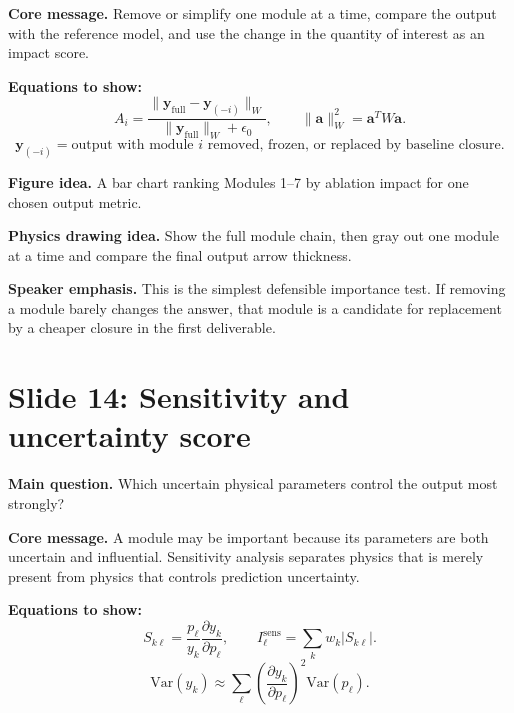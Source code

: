 \documentclass[11pt]{article}
\begin{document}
\textbf{Core message.} Remove or simplify one module at a time, compare the output with the reference model, and use the change in the quantity of interest as an impact score.

\textbf{Equations to show:}
\begin{equation*}
A_i =
\frac{\|\mathbf{y}_{\mathrm{full}}-
\mathbf{y}_{(-i)}\|_W}{\|\mathbf{y}_{\mathrm{full}}\|_W+\epsilon_0},
\qquad
\|\mathbf{a}\|_W^2=\mathbf{a}^{T}W\mathbf{a}.
\end{equation*}
\begin{equation*}
\mathbf{y}_{(-i)}=\text{output with module }i\text{ removed, frozen, or replaced by baseline closure}.
\end{equation*}

\textbf{Figure idea.} A bar chart ranking Modules 1--7 by ablation impact for one chosen output metric.

\textbf{Physics drawing idea.} Show the full module chain, then gray out one module at a time and compare the final output arrow thickness.

\textbf{Speaker emphasis.} This is the simplest defensible importance test. If removing a module barely changes the answer, that module is a candidate for replacement by a cheaper closure in the first deliverable.

\section{Slide 14: Sensitivity and uncertainty score}
\begin{physicsbox}
\textbf{Main question.} Which uncertain physical parameters control the output most strongly?
\end{physicsbox}

\textbf{Core message.} A module may be important because its parameters are both uncertain and influential. Sensitivity analysis separates physics that is merely present from physics that controls prediction uncertainty.

\textbf{Equations to show:}
\begin{equation*}
S_{k\ell}=
\frac{p_\ell}{y_k}\frac{\partial y_k}{\partial p_\ell},
\qquad
I_{\ell}^{\mathrm{sens}}=\sum_k w_k |S_{k\ell}|.
\end{equation*}
\begin{equation*}
\mathrm{Var}(y_k)\approx
\sum_{\ell}\left(\frac{\partial y_k}{\partial p_\ell}\right)^2\mathrm{Var}(p_\ell).
\end{equation*}
\end{document}
